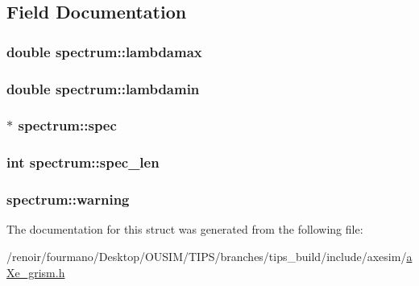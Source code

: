 \subsection{Field Documentation}
\hypertarget{structspectrum_af417db865af6ae56481377ad9b0f0eff}{
\subsubsection[{lambdamax}]{\setlength{\rightskip}{0pt plus 5cm}double {\bf spectrum::lambdamax}}}
\label{structspectrum_af417db865af6ae56481377ad9b0f0eff}
\hypertarget{structspectrum_a0c1fc08d8e906a2cf2309c7a88761fd6}{
\subsubsection[{lambdamin}]{\setlength{\rightskip}{0pt plus 5cm}double {\bf spectrum::lambdamin}}}
\label{structspectrum_a0c1fc08d8e906a2cf2309c7a88761fd6}
\hypertarget{structspectrum_a12640df5c0e35a9a377291dd11022bcf}{
\subsubsection[{spec}]{$\ast$ {\bf spectrum::spec}}}
\label{structspectrum_a12640df5c0e35a9a377291dd11022bcf}
\hypertarget{structspectrum_a7f1df316451ab775f47013bc7c556f08}{
\subsubsection[{spec\_\-len}]{\setlength{\rightskip}{0pt plus 5cm}int {\bf spectrum::spec\_\-len}}}
\label{structspectrum_a7f1df316451ab775f47013bc7c556f08}
\hypertarget{structspectrum_a9db80753621188168361c845f8c2bd9a}{
\subsubsection[{warning}]{ {\bf spectrum::warning}}}
\label{structspectrum_a9db80753621188168361c845f8c2bd9a}


The documentation for this struct was generated from the following file:\begin{DoxyCompactItemize}
\item 
/renoir/fourmano/Desktop/OUSIM/TIPS/branches/tips\_\-build/include/axesim/\hyperlink{aXe__grism_8h}{aXe\_\-grism.h}\end{DoxyCompactItemize}
